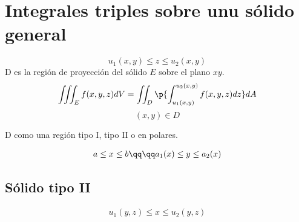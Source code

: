 \section{Integrales triples sobre unu sólido general}
\[
  u_1(x,y) \leq z \leq u_2(x,y) 
\]
D es la región de proyección del sólido $E$ sobre el plano $xy$.
\[
    \iiint_{E}^{}f(x,y,z)dV = \iint_{D}^{}\p{\int_{u_1(x,y)}^{u_2(x,y)} f(x,y,z)dz } dA  
\]
\[
  (x,y) \in D
\]

D como una región tipo I, tipo II o en polares.
\begin{center}
   \begin{align*}
       a \leq x \leq b \qq \qq a_1(x) \leq y \leq a_2(x) \\ 
   \end{align*}
\end{center}


\subsection{Sólido tipo II}
\begin{center}
   \begin{align*}
       u_1(y,z) \leq x \leq u_2(y,z) \\ 
   \end{align*}
   \begin{figure}[H]
       \centering
   \end{figure}
\end{center}
